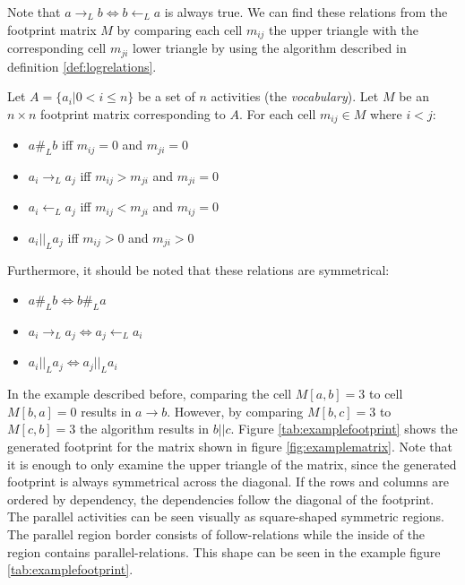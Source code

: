 Note that $a \rightarrow_L b \Leftrightarrow b \leftarrow_L a$ is always true.
We can find these relations from the footprint matrix $M$ by comparing each cell $m_{ij}$ the upper triangle with the corresponding cell $m_{ji}$ lower triangle by using the algorithm described in definition \ref{def:logrelations}.

\begin{definition}
Let $A = \{ a_i | 0 < i \le n \}$ be a set of $n$ activities (the \emph{vocabulary}).
Let $M$ be an $n \times n$ footprint matrix corresponding to $A$.
For each cell $m_{ij} \in M$ where $i < j$:
\begin{itemize}
    \item $a \#_L b$ iff $m_{ij} = 0$ and $m_{ji} = 0$
    \item $a_i \rightarrow_L a_j$ iff $m_{ij} > m_{ji}$ and $m_{ji} = 0$
    \item $a_i \leftarrow_L a_j$ iff $m_{ij} < m_{ji}$ and $m_{ij} = 0$
    \item $a_i ||_L a_j$ iff $m_{ij} > 0$ and $m_{ji} > 0$
\end{itemize}
Furthermore, it should be noted that these relations are symmetrical:
\begin{itemize}
    \item $a \#_L b \Leftrightarrow b \#_L a$ 
    \item $a_i \rightarrow_L a_j \Leftrightarrow a_j \leftarrow_L a_i$
    \item $a_i ||_L a_j \Leftrightarrow a_j ||_L a_i$ 
\end{itemize}
\label{def:logrelations}
\end{definition}

In the example described before, comparing the cell $M[a,b] = 3$ to cell $M[b,a] = 0$ results in $a \rightarrow b$.
However, by comparing $M[b,c] = 3$ to $M[c,b] = 3$ the algorithm results in $b || c$. 
Figure \ref{tab:examplefootprint} shows the generated footprint for the matrix shown in figure \ref{fig:examplematrix}.
Note that it is enough to only examine the upper triangle of the matrix, since the generated footprint is always symmetrical across the diagonal.
If the rows and columns are ordered by dependency, the dependencies follow the diagonal of the footprint.
The parallel activities can be seen visually as square-shaped symmetric regions.
The parallel region border consists of follow-relations while the inside of the region contains parallel-relations.
This shape can be seen in the example figure \ref{tab:examplefootprint}.

